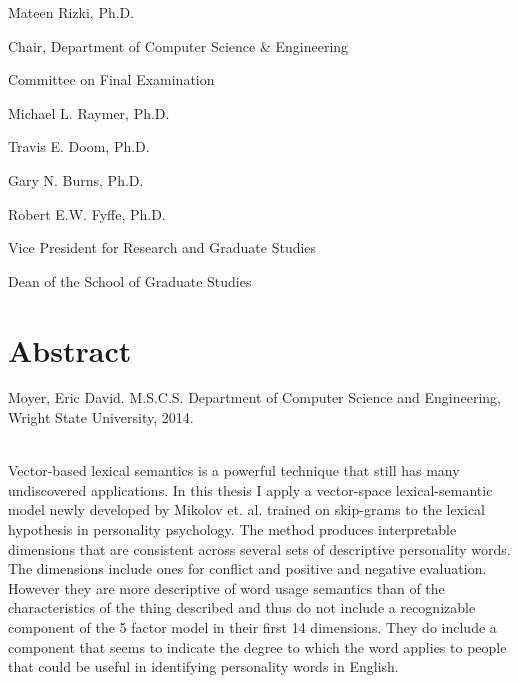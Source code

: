 \vspace{0.5in}\hspace{2.5in}\underline{\hspace{3in}}

\hspace{2.5in}Mateen Rizki, Ph.D.

\hspace{2.5in}Chair, Department of Computer Science
        \& Engineering

\vspace{0.5in}
Committee on Final Examination

\vspace{0.5in}\underline{\hspace{3in}}

Michael L. Raymer, Ph.D.
        
\vspace{0.5in}\underline{\hspace{3in}}

Travis E. Doom, Ph.D.
        
\vspace{0.5in}\underline{\hspace{3in}}

Gary N. Burns, Ph.D.        

\vspace{0.5in}\underline{\hspace{3in}}

Robert E.W. Fyffe, Ph.D.

Vice President for Research and Graduate Studies

Dean of the School of Graduate Studies


\chapter{Abstract}

\setcounter{page}{3}

\singlespace
Moyer, Eric David. M.S.C.S. Department of Computer Science and Engineering, 
Wright State University, 2014. \thesistitle

\hspace{1in}\\

\doublespace
Vector-based lexical semantics is a powerful technique that still has many 
undiscovered applications. In this thesis I apply a vector-space 
lexical-semantic model newly developed by Mikolov et. al. trained on 
skip-grams to the lexical hypothesis in personality psychology. The method
produces interpretable dimensions that are consistent across several sets of
descriptive personality words. The dimensions include ones for conflict and
positive and negative evaluation. However they are more descriptive of
word usage semantics than of the characteristics of the thing described and 
thus do not include a recognizable component of the 5 factor model in their 
first 14 dimensions. They do include a component that seems to indicate the 
degree to which the word applies to people that could be useful in identifying
personality words in English.

